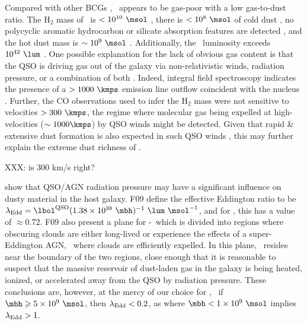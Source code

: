 \documentclass[useAMS,usenatbib]{mn2e}
\begin{document}
Compared with other BCGs \citep[\eg][]{2001MNRAS.328..762E},
\irs\ appears to be gas-poor with a low gas-to-dust ratio. The H$_2$
mass of \irs\ is $< 10^{10} ~\msol$ \citep{1998ApJ...506..205E}, there
is $< 10^8 ~\msol$ of cold dust \citep{2001MNRAS.326.1467D}, no
polycyclic aromatic hydrocarbon or silicate absorption features are
detected \citep{2004ApJ...613..986P, 2008ApJ...683..114S}, and the hot
dust mass is $\sim 10^9 ~\msol$
\citep{1997A&A...318L...1T}. Additionally, the \halpha\ luminosity
exceeds $10^{42} ~\lum$ \citep{1996MNRAS.283.1003C,
  1998ApJ...506..205E}. One possible explanation for the lack of
obvious gas content is that the QSO is driving gas out of the galaxy
via non-relativistic winds, radiation pressure, or a combination of
both \citep[\eg][]{2010MNRAS.401....7H}. Indeed, integral field
spectroscopy indicates the presence of a $> 1000 ~\kmps$ emission line
outflow coincident with the nucleus
\citep{1996MNRAS.283.1003C}. Further, the CO observations used to
infer the H$_2$ mass \citep{1998ApJ...506..205E} were not sensitive to
velocities $> 300 ~\kmps$, the regime where molecular gas being
expelled at high-velocities ($\sim 1000 \kmps$) by QSO winds might be
detected. Given that rapid \& extensive dust formation is also
expected in such QSO winds \citep{2002ApJ...567L.107E}, this may
further explain the extreme dust richness of \irs.

XXX: is 300 km/s right?

\citet[][hereafter F09]{2009MNRAS.394L..89F} show that QSO/AGN
radiation pressure may have a significant influence on dusty material
in the host galaxy. F09 define the effective Eddington ratio to be
$\leff = \lqso (1.38 \times 10^{38} ~\mbh)^{-1} ~\lum ~\msol^{-1}$,
and for \irs, this has a value of $\approx 0.72$. F09 also present a
plane for \nhobs-\leff\ which is divided into regions where obscuring
clouds are either long-lived or experience the effects of a
super-Eddington AGN, \ie\ where clouds are efficiently expelled. In
this plane, \irs\ resides near the boundary of the two regions, close
enough that it is reasonable to suspect that the massive reservoir of
dust-laden gas in the galaxy is being heated, ionized, or accelerated
away from the QSO by radiation pressure. These conclusions are,
however, at the mercy of our choice for \mbh, \ie\ if $\mbh \ge 5
\times 10^9 ~\msol$, then $\lambda_{\mathrm{Edd}} < 0.2$, as where $\mbh < 1 \times
10^9 ~\msol$ implies $\lambda_{\mathrm{Edd}} > 1$.
\end{document}
